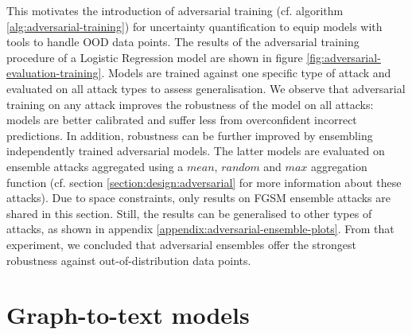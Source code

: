 This motivates the introduction of adversarial training (cf. algorithm \ref{alg:adversarial-training}) for uncertainty quantification to equip models with tools to handle OOD data points. The results of the adversarial training procedure of a Logistic Regression model are shown in figure \ref{fig:adversarial-evaluation-training}. Models are trained against one specific type of attack and evaluated on all attack types to assess generalisation. We observe that adversarial training on any attack improves the robustness of the model on all attacks: models are better calibrated and suffer less from overconfident incorrect predictions. In addition, robustness can be further improved by ensembling independently trained adversarial models. The latter models are evaluated on ensemble attacks aggregated using a $mean$, $random$ and $max$ aggregation function (cf. section \ref{section:design:adversarial} for more information about these attacks). Due to space constraints, only results on FGSM ensemble attacks are shared in this section. Still, the results can be generalised to other types of attacks, as shown in appendix \ref{appendix:adversarial-ensemble-plots}. From that experiment, we concluded that adversarial ensembles offer the strongest robustness against out-of-distribution data points. 






\section{Graph-to-text models}


